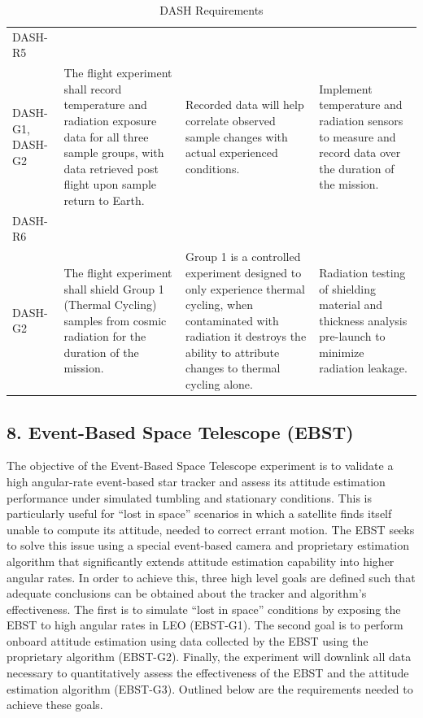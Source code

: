\documentclass[conf]{new-aiaa}
\begin{document}
\begin{table}[H]
\begin{tabularx}{\textwidth}{@{}>{\raggedright\arraybackslash}m{2.4cm}YYY@{}}
    DASH-R5\\DASH-G1, DASH-G2 &
    The flight experiment shall record temperature and radiation exposure data for all three sample groups, with data retrieved post flight upon sample return to Earth. &
    Recorded data will help correlate observed sample changes with actual experienced conditions. &
    Implement temperature and radiation sensors to measure and record data over the duration of the mission. \\ \hline

    DASH-R6\\DASH-G2 &
    The flight experiment shall shield Group 1 (Thermal Cycling) samples from cosmic radiation for the duration of the mission. &
    Group 1 is a controlled experiment designed to only experience thermal cycling,  when contaminated with radiation it destroys the ability to attribute changes to thermal cycling alone. &
    Radiation testing of shielding material and thickness analysis pre-launch to minimize radiation leakage. \\
    \bottomrule
    \end{tabularx}
    \caption{DASH Requirements}
    \label{tab:dash_requirements}
\end{table}


\clearpage
\subsection{8. Event-Based Space Telescope (EBST)}

The objective of the Event-Based Space Telescope experiment is to validate a high angular-rate event-based star tracker and assess its attitude estimation performance under simulated tumbling and stationary conditions. This is particularly useful for ``lost in space'' scenarios in which a satellite finds itself unable to compute its attitude, needed to correct errant motion. The EBST seeks to solve this issue using a special event-based camera and proprietary estimation algorithm that significantly extends attitude estimation capability into higher angular rates. In order to achieve this, three high level goals are defined such that adequate conclusions can be obtained about the tracker and algorithm's effectiveness. The first is to simulate ``lost in space'' conditions by exposing the EBST to high angular rates in LEO (EBST-G1). The second goal is to perform onboard attitude estimation using data collected by the EBST using the proprietary algorithm (EBST-G2). Finally, the experiment will downlink all data necessary to quantitatively assess the effectiveness of the EBST and the attitude estimation algorithm (EBST-G3). Outlined below are the requirements needed to achieve these goals.
\end{document}
